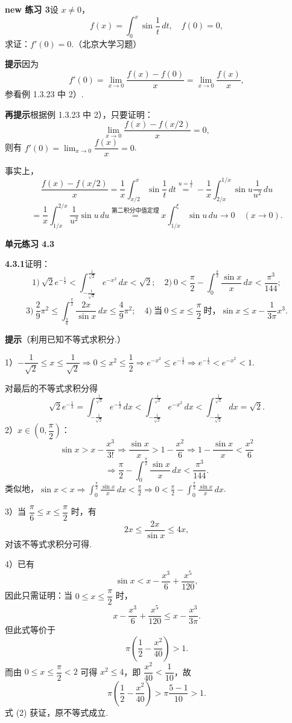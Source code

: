 \documentclass[UTF8, 12pt, fontset=fandol, oneside]{ctexart}
\begin{document}
\noindent\textbf{new 练习 3}\quad 设 $x\ne0$，
\[
f(x)=\int_0^x\sin\frac1t\,dt,\quad f(0)=0,
\]
求证：$f'(0)=0$.（北京大学习题）

\noindent\textbf{提示}\quad 因为
\[
f'(0)=\lim_{x\to0}\frac{f(x)-f(0)}x=\lim_{x\to0}\frac{f(x)}x,
\]
参看例 1.3.23 中 2）.

\noindent\textbf{再提示}\quad 根据例 1.3.23 中 2），只要证明：
\[
\lim_{x\to0}\frac{f(x)-f(x/2)}x=0,
\]
则有 $f'(0)=\displaystyle\lim_{x\to0}\dfrac{f(x)}x=0$.

事实上，
\[
\frac{f(x)-f(x/2)}x
=\frac1x\int_{x/2}^x\sin\frac1t\,dt
\stackrel{u=\frac1t}{=}
-\frac1x\int_{2/x}^{1/x}\sin u\frac1{u^2}\,du
\]
\[
=\frac1x\int_{1/x}^{2/x}\frac1{u^2}\sin u\,du
\stackrel{\text{第二积分中值定理}}{=}
x\int_{1/x}^{\xi}\sin u\,du\to0\quad(x\to0).
\]

\noindent\textbf{单元练习 4.3}

\noindent\textbf{4.3.1}\quad 证明：
\[
1)\ \sqrt2e^{-\frac12}<\int_{-\frac1{\sqrt2}}^{\frac1{\sqrt2}}e^{-x^2}\,dx<\sqrt2;
\quad
2)\ 0<\frac\pi2-\int_0^{\frac\pi2}\frac{\sin x}{x}\,dx<\frac{\pi^3}{144};
\]
\[
3)\ \frac29\pi^2\le\int_{\frac\pi6}^{\frac\pi2}\frac{2x}{\sin x}\,dx\le\frac49\pi^2;
\quad
4)\ 当\ 0\le x\le\frac\pi2\ 时，\sin x\le x-\frac1{3\pi}x^3.
\]

\noindent\textbf{提示}\quad （利用已知不等式求积分.）

1）$-\dfrac1{\sqrt2}\le x\le\dfrac1{\sqrt2}\Rightarrow0\le x^2\le\dfrac12
\Rightarrow e^{-x^2}\le e^{-\frac12}\Rightarrow e^{-\frac12}<e^{-x^2}<1$.

对最后的不等式求积分得
\[
\sqrt2e^{-\frac12}
=\int_{-\frac1{\sqrt2}}^{\frac1{\sqrt2}}e^{-\frac12}\,dx
<\int_{-\frac1{\sqrt2}}^{\frac1{\sqrt2}}e^{-x^2}\,dx
<\int_{-\frac1{\sqrt2}}^{\frac1{\sqrt2}}dx=\sqrt2.
\]
2）$x\in\left(0,\dfrac\pi2\right)$：
\[
\sin x>x-\frac{x^3}{3!}\Rightarrow
\frac{\sin x}{x}>1-\frac{x^2}{6}
\Rightarrow 1-\frac{\sin x}{x}<\frac{x^2}{6}
\]
\[
\Rightarrow\frac\pi2-\int_0^{\frac\pi2}\frac{\sin x}{x}\,dx<\frac{\pi^3}{144}.
\]
类似地，$\sin x<x\Rightarrow\displaystyle\int_0^{\frac\pi2}\frac{\sin x}{x}\,dx<\frac\pi2
\Rightarrow0<\frac\pi2-\int_0^{\frac\pi2}\frac{\sin x}{x}\,dx$.

3）当 $\dfrac\pi6\le x\le\dfrac\pi2$ 时，有
\[
2x\le\frac{2x}{\sin x}\le4x,
\]
对该不等式求积分可得.

4）已有
\[
\sin x<x-\frac{x^3}{6}+\frac{x^5}{120},
\]
因此只需证明：当 $0\le x\le\dfrac\pi2$ 时，
\[
x-\frac{x^3}{6}+\frac{x^5}{120}\le x-\frac{x^3}{3\pi}.
\tag{1}
\]
但此式等价于
\[
\pi\left(\frac12-\frac{x^2}{40}\right)>1.
\tag{2}
\]
而由 $0\le x\le\dfrac\pi2<2$ 可得 $x^2\le4$，即 $\dfrac{x^2}{40}<\dfrac1{10}$，故
\[
\pi\left(\frac12-\frac{x^2}{40}\right)>\pi\frac{5-1}{10}>1.
\]
式 (2) 获证，原不等式成立.
\end{document}
